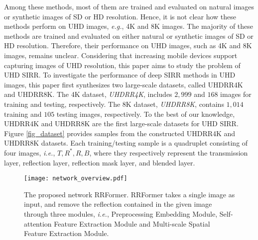 \documentclass[10pt,journal]{IEEEtran}
\begin{document}
Among these methods, most of them are trained and evaluated on natural images or synthetic images of SD or HD resolution. Hence, it is not clear how these methods perform on UHD images, \textit{e.g.}, 4K and 8K images. 
The majority of these methods are trained and evaluated on either natural or synthetic images of SD or HD resolution. Therefore, their performance on UHD images, such as 4K and 8K images, remains unclear. 
%
Considering that increasing mobile devices support capturing images of UHD resolution, %
this paper aims to study the problem of UHD SIRR. To investigate the performance of deep SIRR methods in UHD images, this paper first synthesizes two large-scale datasets, called UHDRR4K and UHDRR8K. %
The 4K dataset, \textsl{UHDRR4K}, includes $2,999$ and $168$ images for training and testing, respectively. The 8K dataset, \textsl{UHDRR8K}, contains $1,014$ training and $105$ testing images, respectively. 
To the best of our knowledge, UHDRR4K and UHDRR8K are the first large-scale datasets for UHD SIRR. 
Figure \ref{fig_dataset} provides samples from the constructed UHDRR4K and UHDRR8K datasets. Each training/testing sample is a quadruplet consisting of four images, \textit{i.e.}, ${T, R^*, R, B}$, where they respectively represent the transmission layer, reflection layer, reflection mask layer, and blended layer.

\IEEEpubidadjcol


\begin{figure}[t]
	\centering
	\texttt{[image: network\_overview.pdf]}
	\caption{The proposed network RRFormer. RRFormer takes a single image as input, and remove the reflection contained in the given image through three modules, \textit{i.e.}, Preprocessing Embedding Module, Self-attention Feature Extraction Module and Multi-scale Spatial Feature Extraction Module.}
	\label{fig_network_overview}
\end{figure}


\begin{figure*}[!t]
	\centering
	\hfil
	\caption{Sample images from the UHDRR4K and UHDRR8K datasets. These two datasets consist of a large number of 4K and 8K UHD images, respectively. Each sample is a quadruplet consisting of four images, \textit{i.e.}, transmission layer, reflection layer, reflection mask layer, and blended layer.}
	\label{fig_dataset}
\end{figure*}
\end{document}
